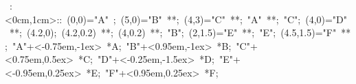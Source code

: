

\hbox{
\xy    <1cm,0cm>:<0cm,1cm>::
       (0,0)="A" ; (5,0)="B" **\dir{-}; 
       (4,3)="C" **\dir{-};  "A" **\dir{-};
       "C"; (4,0)="D" **\dir{-}; 
       (4.2,0); (4.2,0.2) **\dir{-}; (4,0.2) **\dir{-}; 
       "B"; (2,1.5)="E" **\dir{-}; 
       "E"; (4.5,1.5)="F" **\dir{-}; 
       "A"+<-0.75em,-1ex> *{A};
       "B"+<0.95em,-1ex> *{B};
       "C"+<0.75em,0.5ex> *{C};
       "D"+<-0.25em,-1.5ex> *{D};
       "E"+<-0.95em,0.25ex> *{E};
       "F"+<0.95em,0.25ex> *{F};
\endxy}
	   
